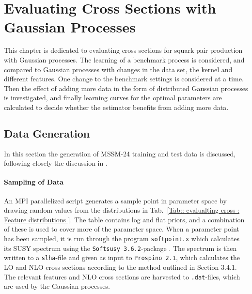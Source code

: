 \documentclass[twoside,english]{uiofysmaster}
\begin{document}
\tableofcontents



\chapter{Evaluating Cross Sections with Gaussian Processes}

This chapter is dedicated to evaluating cross sections for squark pair production with Gaussian processes. The learning of a benchmark process is considered, and compared to Gaussian processes with changes in the data set, the kernel and different features. One change to the benchmark settings is considered at a time. Then the effect of adding more data in the form of distributed Gaussian processes is investigated, and finally learning curves for the optimal parameters are calculated to decide whether the estimator benefits from adding more data.

\section{Data Generation}

In this section the generation of MSSM-24 training and test data is discussed, following closely the discussion in \cite{sparre2018fast}. 

\subsubsection{Sampling of Data}

An MPI parallelized script generates a sample point in parameter space by drawing random values from the distributions in Tab.~\ref{Tab:: evalualting cross : Feature distributions }. The table contains log and flat priors, and a combination of these is used to cover more of the parameter space. When a parameter point has been sampled, it is run through the program \verb|softpoint.x| which calculates its SUSY spectrum using the \verb|Softsusy 3.6.2|-package \cite{ALLANACH2002305}. The spectrum is then written to a \verb|slha|-file and given as input to \verb|Prospino 2.1|, which calculates the LO and NLO cross sections according to the method outlined in Section 3.4.1. The relevant features and NLO cross sections are harvested to \verb|.dat|-files, which are used by the Gaussian processes. 
\end{document}
